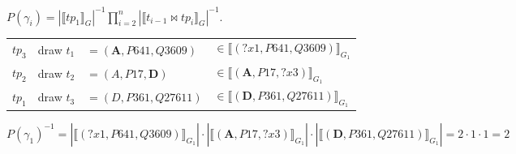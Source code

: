 \documentclass[25pt, a0paper, portrait]{tikzposter}
\begin{document}
{  %

  $P(\gamma_i) = |\llbracket tp_1 \rrbracket_G|^{-1} \prod_{i=2}^{n}
  |\llbracket t_{i-1} \bowtie tp_i \rrbracket_G|^{-1}$.


\begin{center}
  \begin{tabular}{l|lll}
    $tp_3$ & draw  $t_1$ &$= (\textbf{A}, P641, Q3609)$ & $\in \llbracket (?x1, P641, Q3609) \rrbracket_{G_1}$ \\
    $tp_2$ & draw  $t_2$ &$= (A, P17, \textbf{D})$ & $ \in \llbracket (\textbf{A}, P17, ?x3) \rrbracket_{G_1}$  \\
    $tp_1$ & draw  $t_3$ &$= (D, P361, Q27611)$ & $\in \llbracket (\textbf{D}, P361, Q27611) \rrbracket_{G_1}$  
  \end{tabular}
\end{center} 


\begin{small}
$P(\gamma_1)^{-1}  =  |\llbracket (?x1, P641, Q3609) \rrbracket_{G_1}| \cdot
                          |\llbracket (\textbf{A}, P17, ?x3) \rrbracket_{G_1}| \cdot
                          |\llbracket (\textbf{D}, P361,
                          Q27611) \rrbracket_{G_1}| 
                      =  2 \cdot 1 \cdot 1 = 2$
\end{small}


}
\end{document}
